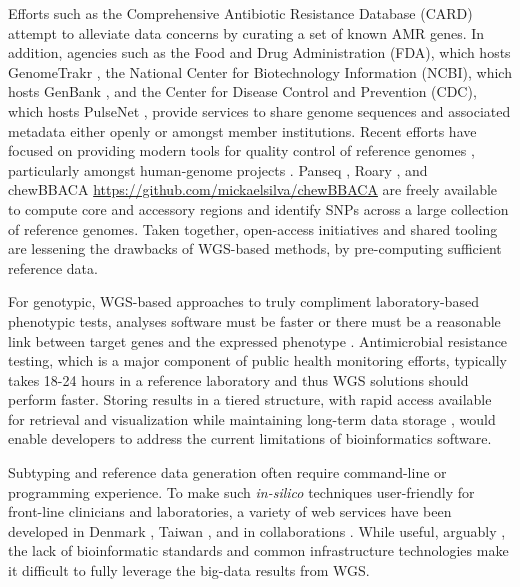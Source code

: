 \documentclass[a4,center,fleqn]{NAR}
\begin{document}
Efforts such as the Comprehensive Antibiotic Resistance Database (CARD) \cite{mcarthur2013comprehensive} attempt to alleviate data concerns by curating a set of known AMR genes.
In addition, agencies such as the Food and Drug Administration (FDA), which hosts GenomeTrakr \cite{allard2016practical}, the National Center for Biotechnology Information (NCBI), which hosts GenBank \cite{doi:10.1093/nar/gks1195}, and the Center for Disease Control and Prevention (CDC), which hosts PulseNet \cite{swaminathan2001pulsenet}, provide services to share genome sequences and associated metadata either openly or amongst member institutions.
Recent efforts have focused on providing modern tools for quality control of reference genomes \cite{parks2015checkm}, particularly amongst human-genome projects \cite{lee2017ngscheckmate}.
Panseq \cite{laing2010pan}, Roary \cite{page2015roary}, and chewBBACA \url{https://github.com/mickaelsilva/chewBBACA} are freely available to compute core and accessory regions and identify SNPs across a large collection of reference genomes.
Taken together, open-access initiatives and shared tooling are lessening the drawbacks of WGS-based methods, by pre-computing sufficient reference data.

For genotypic, WGS-based approaches to truly compliment laboratory-based phenotypic tests, analyses software must be faster or there must be a reasonable link between target genes and the expressed phenotype \cite{koser2012routine}.
Antimicrobial resistance testing, which is a major component of public health monitoring efforts, typically takes 18-24 hours in a reference laboratory \cite{koser2012routine} and thus WGS solutions should perform faster.
Storing results in a tiered structure, with rapid access available for retrieval and visualization while maintaining long-term data storage \cite{schatz2015biological}, would enable developers to address the current limitations \cite{de2015trends} of bioinformatics software.

Subtyping and reference data generation often require command-line or programming experience.
To make such \textit{in-silico} techniques user-friendly for front-line clinicians and laboratories, a variety of web services have been developed in Denmark \cite{joensen2014real}, Taiwan \cite{liu2016construction}, and in collaborations \cite{hasman2015detection}.
While useful, arguably \cite{fricke2014bacterial}, the lack of bioinformatic standards and common infrastructure technologies make it difficult to fully leverage the big-data results from WGS. 
\end{document}
